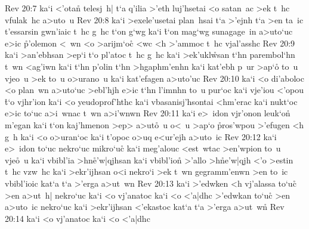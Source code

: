 \vs Rev 20:7
ka`i
<'otan\r{}
telesj~h|
t`a
q'ilia
>'eth
luj'hsetai
<o
satan~ac
>ek
t~hc
vfulak~hc
a>uto~u\bibvsend
\vs Rev 20:8
ka`i
>exele'usetai
plan~hsai
t`a
>'ejnh
t`a
>en
ta~ic
t'essarsin
gwn'iaic
t~hc
g~hc
t`on
g`wg
ka`i
\r{t}`on
mag`wg
sunagage~in
a>uto`uc
e>ic
\r{p}'olemon
<~wn
<o
>arijm`o\r{c}
<wc
<h
>'ammoc
t~hc
vjal'asshc\bibvsend
\vs Rev 20:9
ka`i
>an'ebhsan
>ep`i
t`o
pl'atoc
t~hc
g~hc
ka`i
>ek'ukl\r{w}san
t`hn
parembol`hn
t~wn
<ag'iwn
ka`i
t`hn
p'olin
t`hn
>hgaphm'enhn
ka`i
kat'ebh
p~ur
>ap`o\r{}
to~u
vjeo~u
>ek
to~u
o>urano~u
ka`i
kat'efagen
a>uto'uc\bibvsend
\vs Rev 20:10
ka`i
<o
di'aboloc
<o
plan~wn
a>uto`uc
>ebl'hjh
e>ic
t`hn
l'imnhn
to~u
pur`oc
ka`i
vje'iou
<'opou
\r{t}`o
vjhr'ion
ka`i
<o
yeudoprof'hthc
ka`i
vbasanisj'hsontai
<hm'erac
ka`i
nukt`oc
e>ic
to`uc
a>i~wnac
t~wn
a>i'wnwn\bibvsend
\vs Rev 20:11
ka`i
e>~idon
vjr'onon
leuk`on\r{}
m'egan
ka`i
t`on
kaj'hmenon
>ep>
a>ut\r{o}~u
o<~u
>ap`o
\r{p}ros'wpou
>'efugen
<h
g~h
ka`i
<o
o>uran`oc
ka`i
t'opoc
o>uq
e<ur'ejh
a>uto~ic\bibvsend
\vs Rev 20:12
ka`i
e>~idon
to`uc
nekro`uc
mikro`uc\r{}
ka`i
meg'alouc
<est~wtac
>en'wpion
to~u
vje\r{o}~u
ka`i
vbibl'ia
>hn\r{e}'w|qjhsan
ka`i
vbibl'ion\r{}
>'allo
>h\r{n}e'w|qjh
<'o
>estin
t~hc
vzw~hc
ka`i
>ekr'ijhsan
o<i
nekro`i
>ek
t~wn
gegramm'enwn
>en
to~ic
vbibl'ioic
kat`a
t`a
>'erga
a>ut~wn\bibvsend
\vs Rev 20:13
ka`i
>'edwken
<h
vj'alassa
to`uc\r{}
>en
a>ut~h|
nekro`uc
ka`i
<o
vj'anatoc
ka`i
<o
<'a|dhc
>'edwkan
to`uc\r{}
>en
a>uto~ic
nekro`uc
ka`i
>ekr'ijhsan
<'ekastoc
kat`a
t`a
>'erga
a>ut~w\r{n}\bibvsend
{}
\vs Rev 20:14
ka`i
<o
vj'anatoc
ka`i
<o
<'a|dhc
